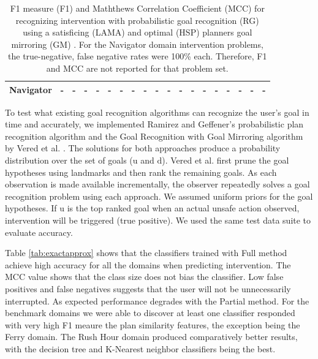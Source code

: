 \documentclass[letterpaper]{article}
\theoremstyle{plain}
\begin{document}
\begin{table}[tb]
{\begin{tabular}{|l|ll|ll|ll|ll|ll|ll|ll|ll|ll|}
\textbf{Navigator}                            & -                       & -                        & -                       & -   & -                       & -   & -                        & -   & -                       & -   & -                       & -   & -                        & -   & -                       & -   & -                       & -   \\ \hline
\end{tabular}%
}
\caption{F1 measure (F1) and Maththews Correlation Coefficient (MCC) for recognizing intervention with probabilistic goal recognition (RG)  \cite{ramirez2010probabilistic} using a satisficing (LAMA) and optimal (HSP) planners goal mirroring (GM) \cite{vered2018goalrec}. For the Navigator domain intervention problems, the true-negative, false negative rates were 100\%  each. Therefore, F1 and MCC are not reported for that problem set.}
\label{tab:rgv}
\end{table}

To test what existing goal recognition algorithms can recognize the user's goal in time and accurately, we implemented Ramirez and Geffener's probabilistic plan recognition algorithm \cite{ramirez2010probabilistic} and the Goal Recognition with Goal Mirroring algorithm by Vered et al. . The solutions for both approaches produce a probability distribution over the set of goals ($\mathrm{u}$ and $\mathrm{d}$). Vered et al. first prune the goal hypotheses using landmarks and then rank the remaining goals. As each observation is made available incrementally, the observer repeatedly solves a goal recognition problem using each approach. We assumed uniform priors for the goal hypotheses. If $\mathrm{u}$ is the top ranked goal when an actual unsafe action observed, intervention will be triggered (true positive). We used the same test data suite to evaluate accuracy.

Table \ref{tab:exactapprox} shows that the classifiers trained with Full method achieve high accuracy for all the domains when predicting intervention. The MCC value shows that the class size does not bias the classifier. Low false positives and false negatives suggests that the user will not be unnecessarily interrupted. As expected performance degrades with the Partial method. For the benchmark domains we were able to discover at least one classifier responded with very high F1 meaure the plan similarity features, the exception being the Ferry domain. The Rush Hour domain produced comparatively better results, with the decision tree and K-Nearest neighbor classifiers being the best. 
\end{document}
